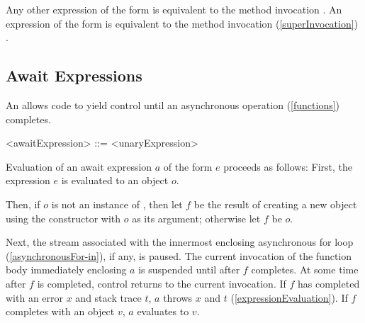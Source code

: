 \documentclass[makeidx]{article}
\begin{document}
{\LMHash{}%
Any other expression of the form  is equivalent to the method invocation .
An expression of the form  is equivalent to the method invocation (\ref{superInvocation}) .


\subsection{Await Expressions}

\LMHash{}%
An  allows code to yield control until an asynchronous operation (\ref{functions}) completes.

\begin{grammar}
<awaitExpression> ::= \AWAIT{} <unaryExpression>
\end{grammar}

\LMHash{}%
Evaluation of an await expression $a$ of the form \AWAIT{} $e$ proceeds as follows:
First, the expression $e$ is evaluated to an object $o$.

\LMHash{}%
Then, if $o$ is not an instance of , then let $f$ be the result of creating a new object using the constructor  with $o$ as its argument; otherwise let $f$ be $o$.

\LMHash{}%
Next, the stream associated with the innermost enclosing asynchronous for loop (\ref{asynchronousFor-in}), if any, is paused.
The current invocation of the function body immediately enclosing $a$ is suspended until after $f$ completes.
At some time after $f$ is completed, control returns to the current invocation.
If $f$ has completed with an error $x$ and stack trace $t$,
$a$ throws $x$ and $t$
(\ref{expressionEvaluation}).
If $f$ completes with an object $v$, $a$ evaluates to $v$.



}
\end{document}
